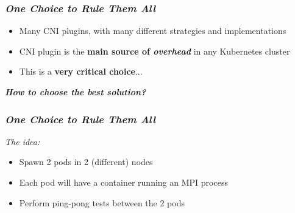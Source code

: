 \begin{frame}
  \frametitle{ \textit{One Choice to Rule Them All}}
  \begin{itemize}
    \itemsep0em
    \item Many CNI plugins, with many different strategies and implementations
    \item CNI plugin is the \alert{\textbf{main source of \textit{overhead}}} in any
      Kubernetes cluster
    \item This is a \textbf{very critical choice}...
  \end{itemize}
  \pause
  \begin{center}
    \large{
      \textit{\textbf{How to choose the best solution?}}
    }
  \end{center}
\end{frame}

\begin{frame}
  \frametitle{ \textit{One Choice to Rule Them All}}
  \vspace{.5em}
  \begin{block}{ \textit{The idea:}}
    \begin{itemize}
      \itemsep0em
      \item<1-> Spawn \alert{2 pods} in \alert{2 (different) nodes}
      \item<2-> Each pod will have a \alert{container} running an \alert{MPI
          process}
      \item<3-> Perform \alert{ping-pong} tests between the 2 pods 
    \end{itemize}
  \end{block}

  \begin{figure}
    \centering
  \end{figure}
\end{frame}

